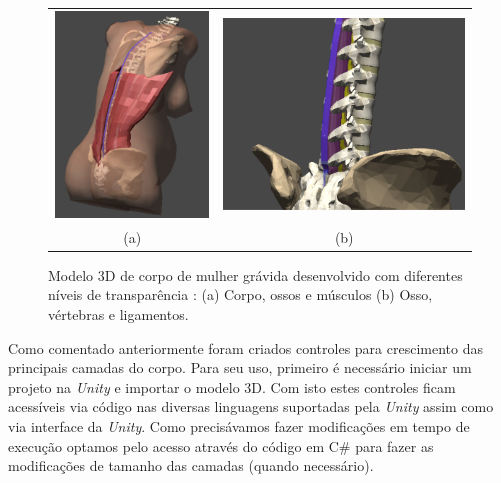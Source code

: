 \begin{figure}[ht!]
    \centering
        \begin{tabular}{cc}
        \includegraphics[width=0.4\linewidth]{capitulos/figuras/modelo corpo 3d.PNG} & 
        \includegraphics[width=0.6\linewidth]{capitulos/figuras/modelo corpo 3d - coluna vertebral, ligamentos supra, interespinhoso and flavum.PNG} 
        \\
        (a) & (b)
        \end{tabular}
    \caption{Modelo 3D de corpo de mulher grávida desenvolvido com diferentes níveis de transparência \cite{Melo2021}: (a) Corpo, ossos e músculos (b) Osso, vértebras e ligamentos.}
    \label{fig:modelo3Dcorpo}
\end{figure}

Como comentado anteriormente foram criados controles para crescimento das principais camadas do corpo. Para seu uso, primeiro é necessário iniciar um projeto na \textit{Unity} e importar o modelo 3D. Com isto estes controles ficam acessíveis via código nas diversas linguagens suportadas pela \textit{Unity} assim como via interface da \textit{Unity}. Como precisávamos fazer modificações em tempo de execução optamos pelo acesso através do código em C\# para fazer as modificações de tamanho das camadas (quando necessário). 

